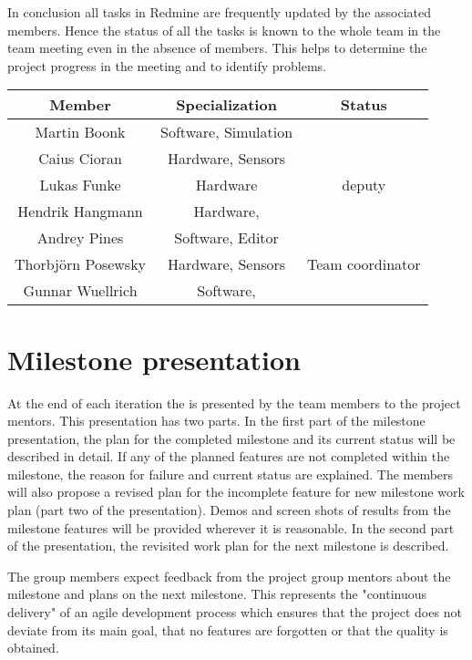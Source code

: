 In conclusion all tasks in Redmine are frequently updated by the associated members.
Hence the status of all the tasks is known to the whole team in the team meeting even in the absence of members.
This helps to determine the project progress in the meeting and to identify problems.

\vspace{1cm}

\begin{center}
\begin{tabular}{c|c|c}
\hline
Member & Specialization & Status \\
\hline
\hline
Martin Boonk & Software, Simulation &  \\ 
\hline
Caius Cioran & Hardware, Sensors &  \\ 
\hline
Lukas Funke & Hardware & deputy \\ 
\hline
Hendrik Hangmann & Hardware, \todo{?} &  \\ 
\hline
Andrey Pines & Software, Editor &  \\ 
\hline
Thorbj\"orn Posewsky & Hardware, Sensors & Team coordinator \\ 
\hline
Gunnar Wuellrich & Software, \todo{?} &  \\ 
\hline 
\end{tabular}
\end{center}

\section{Milestone presentation}

At the end of each iteration the is presented by the team members to the project mentors. This presentation has two parts.
In the ﬁrst part of the milestone presentation, the plan for the completed milestone and its current status will be described in detail.
If any of the planned features are not completed within the milestone, the reason for failure and current status are explained.
The members will also propose a revised plan for the incomplete feature for new milestone work plan (part two of the presentation).
Demos and screen shots of results from the milestone features will be provided wherever it is reasonable.
In the second part of the presentation, the revisited work plan for the next milestone is described.

The group members expect feedback from the project group mentors about the milestone and plans on the next milestone.
This represents the "continuous delivery" of an agile development process which ensures that the project does not deviate from its main goal,
that no features are forgotten or that the quality is obtained.